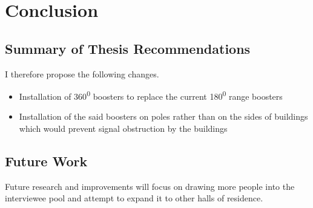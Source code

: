 
\chapter{Conclusion}

\label{ch:conclusions}

\section{Summary of Thesis Recommendations}

I therefore propose the following changes.
\begin{itemize}
    \item Installation of 360\textsuperscript{0} boosters to replace the current 180\textsuperscript{0} range boosters
    \item Installation of the said boosters on poles rather than on the sides of buildings which would prevent signal obstruction by the buildings
\end{itemize}


\section{Future Work}

Future research and improvements will focus on drawing more people into the interviewee pool and attempt to expand it to other halls of residence.